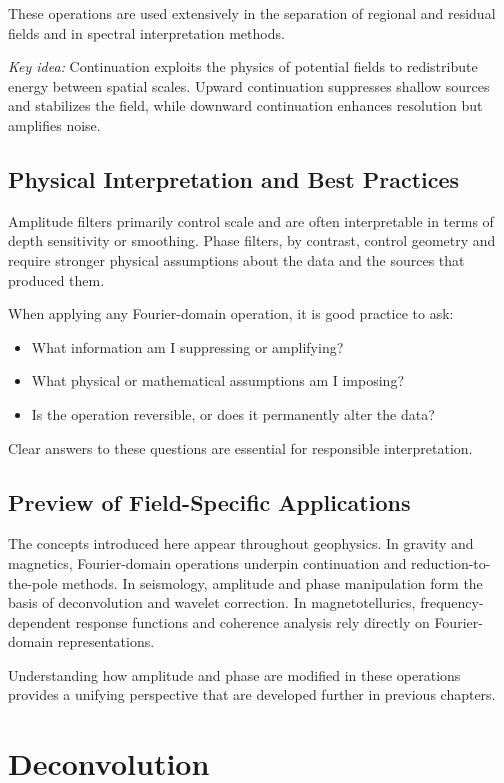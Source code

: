 These operations are used extensively in the separation of regional and residual fields and in spectral interpretation methods.

\emph{Key idea:} Continuation exploits the physics of potential fields to redistribute energy between spatial scales. Upward continuation suppresses shallow sources and stabilizes the field, while downward continuation enhances resolution but amplifies noise.

\subsection{Physical Interpretation and Best Practices}

Amplitude filters primarily control scale and are often interpretable in terms of depth sensitivity or smoothing. Phase filters, by contrast, control geometry and require stronger physical assumptions about the data and the sources that produced them.

When applying any Fourier-domain operation, it is good practice to ask:
\begin{itemize}
    \item What information am I suppressing or amplifying?
    \item What physical or mathematical assumptions am I imposing?
    \item Is the operation reversible, or does it permanently alter the data?
\end{itemize}

Clear answers to these questions are essential for responsible interpretation.

\subsection{Preview of Field-Specific Applications}

The concepts introduced here appear throughout geophysics. In gravity and magnetics, Fourier-domain operations underpin continuation and reduction-to-the-pole methods. In seismology, amplitude and phase manipulation form the basis of deconvolution and wavelet correction. In magnetotellurics, frequency-dependent response functions and coherence analysis rely directly on Fourier-domain representations.

Understanding how amplitude and phase are modified in these operations provides a unifying perspective that are developed further in previous chapters.

\section{Deconvolution}

